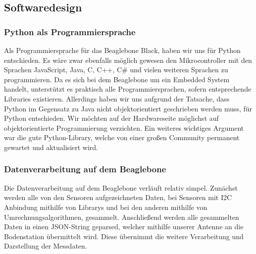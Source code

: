 \subsection{Softwaredesign}
\subsubsection{Python als Programmiersprache}
Als Programmiersprache für das Beaglebone Black, haben wir uns für Python entschieden. Es wäre zwar ebenfalls möglich gewesen den Mikrocontroller mit den Sprachen JavaScript, Java, C, C++, C\# und vielen weiteren Sprachen zu programmieren. Da es sich bei dem Beaglebone um ein Embedded System handelt, unterstützt es praktisch alle Programmiersprachen, sofern entsprechende Libraries existieren. Allerdings haben wir uns aufgrund der Tatsache, dass Python im Gegensatz zu Java nicht objektorientiert geschrieben werden muss, für Python entschieden. Wir möchten auf der Hardwareseite möglichst auf objektorientierte Programmierung verzichten. Ein weiteres wichtiges Argument war die gute Python-Library, welche von einer großen Community permanent gewartet und aktualisiert wird.
\subsubsection{Datenverarbeitung auf dem Beaglebone}
Die Datenverarbeitung auf dem Beaglebone verläuft relativ simpel. Zunächst werden alle von den Sensoren aufgezeichneten Daten, bei Sensoren mit I2C Anbindung mithilfe von Librarys und bei den anderen mithilfe von Umrechnungsalgorithmen, gesammelt. Anschließend werden alle gesammelten Daten in einen JSON-String geparsed, welcher mithilfe unserer Antenne an die Bodenstation übermittelt wird. Diese übernimmt die weitere Verarbeitung und Darstellung der Messdaten. 
